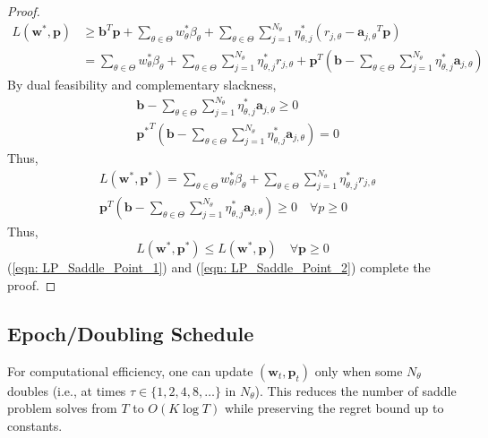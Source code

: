 \documentclass[11pt]{article}
\newcommand{\bb}{\mathbf{b}}
\newcommand{\ba}{\mathbf{a}}
\newcommand{\bp}{\mathbf{p}}
\newcommand{\bw}{\mathbf{w}}
\begin{document}
\begin{proof}
\begin{equation*}
\begin{aligned}
            L(\bw^*,\bp) & \geq  \bb^T\bp + \sum_{\theta\in\Theta}w^*_{\theta}\beta_{\theta}+ \sum_{\theta\in\Theta}\sum_{j=1}^{N_{\theta}}\eta^*_{\theta,j}(r_{j,\theta}-{\ba_{j,\theta}}^T\bp)\\
            &=\sum_{\theta\in\Theta}w^*_{\theta}\beta_{\theta}+ \sum_{\theta\in\Theta}\sum_{j=1}^{N_{\theta}}\eta^*_{\theta,j}r_{j,\theta} + \bp^T(\bb-\sum_{\theta\in\Theta}\sum_{j=1}^{N_{\theta}}\eta^*_{\theta,j}\ba_{j,\theta})
        \end{aligned}
    \end{equation*}
    By dual feasibility and complementary slackness,
    \begin{equation*}
        \begin{aligned}
            &\bb-\sum_{\theta\in\Theta}\sum_{j=1}^{N_{\theta}}\eta^*_{\theta,j}\ba_{j,\theta}\geq 0\\
            & {\bp^*}^T(\bb-\sum_{\theta\in\Theta}\sum_{j=1}^{N_{\theta}}\eta^*_{\theta,j}\ba_{j,\theta}) = 0
        \end{aligned}
    \end{equation*}
    Thus,
    \begin{equation*}
        \begin{aligned}
            &L(\bw^*,\bp^*) = \sum_{\theta\in\Theta}w^*_{\theta}\beta_{\theta}+\sum_{\theta\in\Theta}\sum_{j=1}^{N_{\theta}}\eta^*_{\theta,j}r_{j,\theta}\\
            &{\bp}^T(\bb-\sum_{\theta\in\Theta}\sum_{j=1}^{N_{\theta}}\eta^*_{\theta,j}\ba_{j,\theta})\geq 0\quad\forall p\geq 0
        \end{aligned}
    \end{equation*}
    Thus,
    \begin{equation}\label{eqn: LP_Saddle_Point_2}
        L(\bw^*,\bp^*)\leq L(\bw^*,\bp)\quad\forall \bp\geq 0
    \end{equation}
    (\ref{eqn: LP_Saddle_Point_1}) and (\ref{eqn: LP_Saddle_Point_2}) complete the proof.
\end{proof}
\subsection{Epoch/Doubling Schedule}

For computational efficiency, one can update $(\bw_t, \bp_t)$ only when some $N_\theta$ doubles (i.e., at times $\tau \in \{1, 2, 4, 8, \ldots\}$ in $N_\theta$). This reduces the number of saddle problem solves from $T$ to $O(K \log T)$ while preserving the regret bound up to constants.
\end{document}
